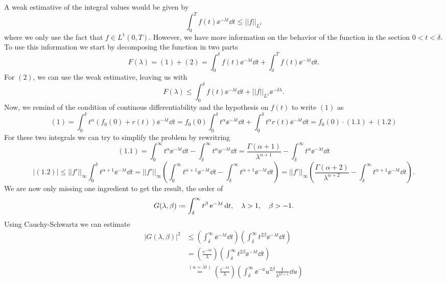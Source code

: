 \begin{Mproof}
	A weak estimative of the integral values would be given by
	$$\int_{0}^{T} f(t) \ee^{-\lambda t} \dd t \leq ||f||_{L^1}$$
	where we only use the fact that $f \in L^1(0,T)$. However, we have more information on the behavior of the function in the section $0 < t < \delta$. To use this information we start by decomposing the function in two parts
	$$F(\lambda) = (1) + (2) = \int_{0}^{\delta} f(t) \ee^{-\lambda t} \dd t + \int_{\delta}^{T} f(t) \ee^{-\lambda t} \dd t.$$
	For $(2)$, we can use the weak estimative, leaving us with 
	$$F(\lambda) \leq \int_{0}^{\delta} f(t) \ee^{-\lambda t} \dd t + ||f||_{L^1} \ee^{-\delta \lambda}.$$
	Now, we remind of the condition of continous differentiability and the hypothesis on $f(t)$ to write $(1)$ as
	$$(1) = \int_{0}^{\delta} t^\alpha(f_0(0) + r(t)) \ee^{-\lambda t} \dd t = f_0(0) \int_{0}^{\delta} t^\alpha \ee^{-\lambda t} \dd t + \int_{0}^{\delta} t^\alpha r(t) \ee^{-\lambda t} \dd t = f_0(0) \cdot (1.1) + (1.2)$$
	For these two integrals we can try to simplify the problem by rewritring 
	$$(1.1) = \int_{0}^{\infty} t^\alpha \ee^{-\lambda t} \dd t - \int_{\delta}^{\infty} t^\alpha \ee^{-\lambda t} \dd t  = \frac{\Gamma(\alpha + 1)}{\lambda^{\alpha +1}} - \int_{\delta}^{\infty} t^\alpha \ee^{-\lambda t} \dd t $$
	$$|(1.2)| \leq ||f'||_{\infty} \int_{0}^{\delta} t^{\alpha + 1} \ee^{-\lambda t} \dd t = ||f'||_{\infty} \left( \int_{0}^{\infty} t^{\alpha+1} \ee^{-\lambda t} \dd t - \int_{\delta}^{\infty} t^{\alpha+1} \ee^{-\lambda t} \dd t \right) = ||f'||_{\infty} \left( \frac{\Gamma(\alpha + 2)}{\lambda^{\alpha +2}} - \int_{\delta}^{\infty} t^{\alpha+1} \ee^{-\lambda t} \dd t \right).$$
	We are now only missing one ingredient to get the result, the order of
	$$G(\lambda, \beta) \deff \int_{\delta}^{\infty} t^{\beta} \ee^{-\lambda t} \dd t, \ \ \ \lambda > 1, \ \ \ \beta > -1. $$
	Using Cauchy-Schwartz we can estimate
	\begin{equation*}
		\begin{split}
			|G(\lambda, \beta)|^2 & \leq \left( \int_{\delta}^{\infty} \ee^{-\lambda t} \dd t \right) \left(\int_{\delta}^{\infty} t^{2\beta} \ee^{-\lambda t} \dd t \right) \\
			& = \left(\frac{e^{-\lambda \delta}}{\lambda}\right) \left( \int_{\delta}^{\infty} t^{2\beta} \ee^{-\lambda t}\dd t \right)	\\
			& \stackrel{(u=\lambda t)}{=} \left(\frac{e^{-\lambda \delta}}{\lambda}\right) \left( \int_{\delta}^{\infty} \ee^{-u} u^{2\beta} \frac{1}{\lambda^{2\beta + 1}} \dd u \right) \\

\end{split}
\end{equation*}
\end{Mproof}
